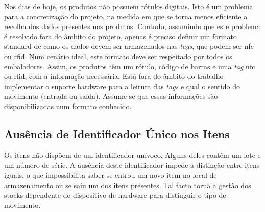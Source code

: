 Nos dias de hoje, os produtos não possuem rótulos digitais. Isto é um problema para a concretização do projeto, na medida em que se torna menos eficiente a recolha dos dados presentes nos produtos. Contudo, assumindo que este problema é resolvido fora do âmbito do projeto, apenas é preciso definir um formato standard de como os dados devem ser armazenados nas \textit{tags}, que podem ser \acrshort{nfc} ou \acrshort{rfid}. Num cenário ideal, este formato deve ser respeitado por todos os embaladores. Assim, os produtos têm um rótulo, código de barras e uma \textit{tag} \acrshort{nfc} ou \acrshort{rfid}, com a informação necessária. Está fora do âmbito do trabalho implementar o suporte hardware para a leitura das \textit{tags} e qual o sentido do movimento (entrada ou saída). Assume-se que essas informações são disponibilizadas num formato conhecido. 


\subsection{Ausência de Identificador Único nos Itens}

Os itens não dispõem de um identificador unívoco. Alguns deles contêm um lote e um número de série. A ausência deste identificador impede a distinção entre itens iguais, o que impossibilita saber se entrou um novo item no local de armazenamento ou se saiu um dos itens presentes. Tal facto torna a gestão dos stocks dependente do dispositivo de hardware para distinguir o tipo de movimento.